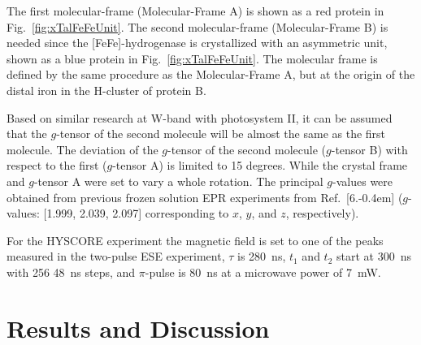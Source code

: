 The first molecular-frame (Molecular-Frame A) is shown as a red protein in Fig.~\ref{fig:xTalFeFeUnit}. The second molecular-frame (Molecular-Frame B) is needed since the [FeFe]-hydrogenase is crystallized with an asymmetric unit, shown as a blue protein in Fig.~\ref{fig:xTalFeFeUnit}. The molecular frame is defined by the same procedure as the Molecular-Frame A, but at the origin of the distal iron in the H-cluster of protein B.

Based on similar research at W-band with photosystem II, it can be assumed that the $g$-tensor of the second molecule will be almost the same as the first molecule. \cite{Hofbauer6623,B908093G} The deviation of the $g$-tensor of the second molecule ($g$-tensor B) with respect to the first ($g$-tensor A) is limited to 15 degrees. While the crystal frame and $g$-tensor A were set to vary a whole rotation. The principal $g$-values were obtained from previous frozen solution EPR experiments from Ref.~[6.\kern-0.4em] ($g$-values: [1.999, 2.039, 2.097] corresponding to $x$, $y$, and $z$, respectively).

For the HYSCORE experiment the magnetic field is set to one of the peaks measured in the two-pulse ESE experiment, $\tau$ is 280~ns, $t_1$ and $t_2$ start at 300~ns with 256 48~ns steps, and $\pi$-pulse is 80~ns at a microwave power of 7~mW. 

\clearpage
\section{Results and Discussion}
